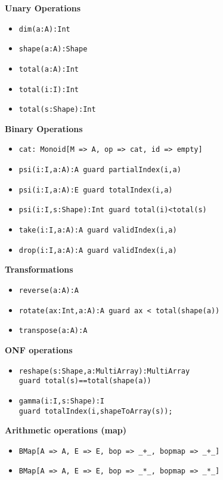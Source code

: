 \documentclass{article}
\begin{document}
\noindent \textbf{Unary Operations}
\begin{itemize}
    \item \texttt{dim(a:A):Int}
    \item \texttt{shape(a:A):Shape}
    \item \texttt{total(a:A):Int}
    \item \texttt{total(i:I):Int}
    \item \texttt{total(s:Shape):Int}
\end{itemize}

\noindent \textbf{Binary Operations}
\begin{itemize}
    \item \texttt{cat: Monoid[M => A, op => cat, id => empty]}
    \item \texttt{psi(i:I,a:A):A guard partialIndex(i,a)}
    \item \texttt{psi(i:I,a:A):E guard totalIndex(i,a)}
    \item \texttt{psi(i:I,s:Shape):Int guard total(i)<total(s)}
    \item \texttt{take(i:I,a:A):A guard validIndex(i,a)}
    \item \texttt{drop(i:I,a:A):A guard validIndex(i,a)}
\end{itemize}

\noindent \textbf{Transformations}
\begin{itemize}
    \item \texttt{reverse(a:A):A}
    \item \texttt{rotate(ax:Int,a:A):A guard ax < total(shape(a))}
    \item \texttt{transpose(a:A):A}
\end{itemize}

\noindent \textbf{ONF operations}
\begin{itemize}
    \item \texttt{reshape(s:Shape,a:MultiArray):MultiArray \\ guard total(s)==total(shape(a))}
    \item \texttt{gamma(i:I,s:Shape):I \\ guard totalIndex(i,shapeToArray(s));}
\end{itemize}


\noindent \textbf{Arithmetic operations (map)}
\begin{itemize}
    \item \texttt{BMap[A => A, E => E, bop => \_+\_, bopmap => \_+\_]}
    \item \texttt{BMap[A => A, E => E, bop => \_*\_, bopmap => \_*\_]}
\end{itemize}
\end{document}
